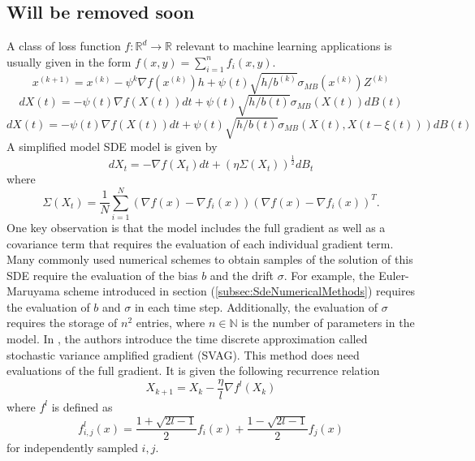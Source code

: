 \documentclass[12pt]{article}
\theoremstyle{definition}
\numberwithin{equation}{section}
\begin{document}
\subsection{Will be removed soon}
A class of loss function $f : \mathbb{R}^d \rightarrow \mathbb{R}$ relevant to machine learning applications is usually given in the form $f(x,y) = \sum_{i=1}^n f_i(x,y)$.
\begin{equation}
  x^{(k+1)} = x^{(k)} - \psi^k \nabla f(x^{(k)}) h +  \psi(t)\sqrt{h/b^{(k)}} \sigma_{MB}(x^{(k)})Z^{(k)}
\end{equation}
\begin{equation}
  dX(t) = -\psi(t)\nabla f(X(t))dt + \psi(t)\sqrt{h/b(t)} \sigma_{MB}(X(t))dB(t)
\end{equation}
\begin{equation}
  dX(t) = -\psi(t)\nabla f(X(t))dt + \psi(t)\sqrt{h/b(t)} \sigma_{MB}(X(t), X(t-\xi(t)))dB(t)
\end{equation}
A simplified model SDE model is given by 
\begin{equation}
  dX_t = -\nabla f(X_t)dt + (\eta \Sigma(X_t))^{\frac{1}{2}}dB_t
\end{equation}
where
\begin{equation}
  \Sigma(X_t) = \frac{1}{N} \sum_{i=1}^N (\nabla f(x) - \nabla f_i(x))(\nabla f(x) - \nabla f_i(x))^T.
\end{equation}
One key observation is that the model includes the full gradient as well as a covariance term that requires the evaluation of each individual gradient term. Many commonly used numerical schemes  to obtain samples of the solution of this SDE require the evaluation of the bias $b$ and the drift $\sigma$. For example, the Euler-Maruyama scheme introduced in section (\ref{subsec:SdeNumericalMethods}) requires the evaluation of $b$ and $\sigma$ in each time step. 
Additionally, the evaluation of $\sigma$ requires the storage of $n^2$ entries, where $n \in \mathbb{N}$ is the number of parameters in the model.
In \autocite{liValidityModelingSGD2021}, the authors introduce the time discrete approximation called stochastic variance amplified gradient (SVAG). This method does need evaluations of the full gradient. It is given the following recurrence relation
\begin{equation}
  X_{k+1} = X_k - \frac{\eta}{l} \nabla f^l(X_k)
\end{equation}
where $f^l$ is defined as
\begin{equation}
  f^l_{i,j}(x) = \frac{1+\sqrt{2l - 1}}{2}f_i(x) + \frac{1-\sqrt{2l - 1}}{2}f_j(x)
\end{equation}
for independently sampled $i,j$.
\end{document}
